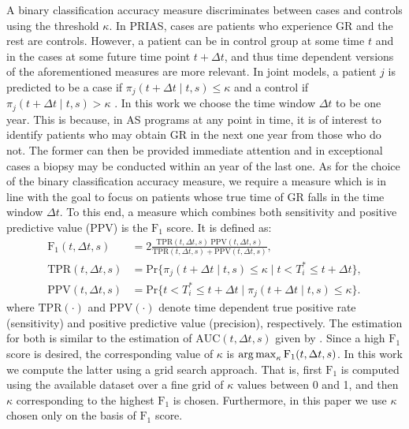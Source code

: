A binary classification accuracy measure discriminates between cases and controls using the threshold $\kappa$. In PRIAS, cases are patients who experience GR and the rest are controls. However, a patient can be in control group at some time $t$ and in the cases at some future time point $t + \Delta t$, and thus time dependent versions of the aforementioned measures are more relevant. In joint models, a patient $j$ is predicted to be a case if $\pi_j(t + \Delta t \mid t,s) \leq \kappa$ and a control if $\pi_j(t + \Delta t \mid t,s) > \kappa$ \citep*{rizopoulosJMbayes, landmarking2017}. In this work we choose the time window $\Delta t$ to be one year. This is because, in AS programs at any point in time, it is of interest to identify patients who may obtain GR in the next one year from those who do not. The former can then be provided immediate attention and in exceptional cases a biopsy may be conducted within an year of the last one. As for the choice of the binary classification accuracy measure, we require a measure which is in line with the goal to focus on patients whose true time of GR falls in the time window $\Delta t$. To this end, a measure which combines both sensitivity and positive predictive value (PPV) is the $\mbox{F}_1$ score. It is defined as:
\begin{align*}
\mbox{F}_1(t, \Delta t, s) &= 2\frac{\mbox{TPR}(t, \Delta t, s)\ \mbox{PPV}(t, \Delta t, s)}{\mbox{TPR}(t, \Delta t, s) + \mbox{PPV}(t, \Delta t, s)},\\
\mbox{TPR}(t, \Delta t, s) &= \mbox{Pr}\big\{\pi_j(t + \Delta t \mid t,s) \leq \kappa \mid t < T^*_i \leq t + \Delta t\big\},\\
\mbox{PPV}(t, \Delta t, s) &= \mbox{Pr}\big\{t < T^*_i \leq t + \Delta t \mid \pi_j(t + \Delta t \mid t,s) \leq \kappa \big\}.
\end{align*}
where $\mbox{TPR}(\cdot)$ and $\mbox{PPV}(\cdot)$ denote time dependent true positive rate (sensitivity) and positive predictive value (precision), respectively. The estimation for both is similar to the estimation of $\mbox{AUC}(t, \Delta t, s)$ given by \citet{landmarking2017}. Since a high $\mbox{F}_1$ score is desired, the corresponding value of $\kappa$ is $\operatorname{arg\,max}_{\kappa} \mbox{F}_1(t, \Delta t, s)$. In this work we compute the latter using a grid search approach. That is, first $\mbox{F}_1$ is computed using the available dataset over a fine grid of $\kappa$ values between 0 and 1, and then $\kappa$ corresponding to the highest $\mbox{F}_1$ is chosen. Furthermore, in this paper we use $\kappa$ chosen only on the basis of $\mbox{F}_1$ score.